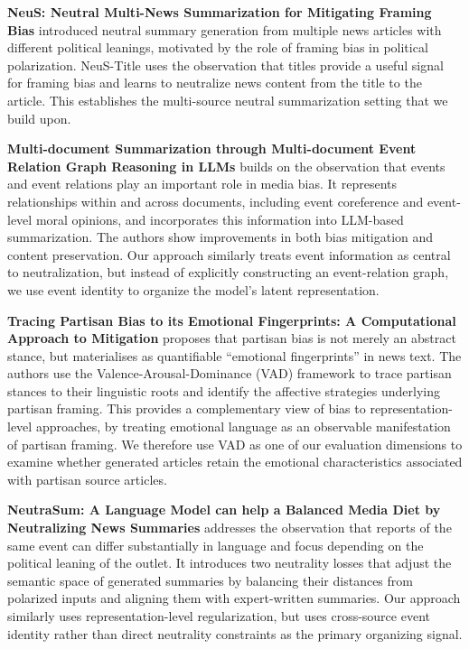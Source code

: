 \documentclass[11pt]{article}
\begin{document}
\textbf{NeuS: Neutral Multi-News Summarization for Mitigating Framing Bias} \citep{lee2022neus} introduced neutral summary generation from multiple news articles with different political leanings, motivated by the role of framing bias in political polarization. NeuS-Title uses the observation that titles provide a useful signal for framing bias and learns to neutralize news content from the title to the article. This establishes the multi-source neutral summarization setting that we build upon.

\textbf{Multi-document Summarization through Multi-document Event Relation Graph Reasoning in LLMs} \citep{lei2025multidoc} builds on the observation that events and event relations play an important role in media bias. It represents relationships within and across documents, including event coreference and event-level moral opinions, and incorporates this information into LLM-based summarization. The authors show improvements in both bias mitigation and content preservation. Our approach similarly treats event information as central to neutralization, but instead of explicitly constructing an event-relation graph, we use event identity to organize the model's latent representation.

\textbf{Tracing Partisan Bias to its Emotional Fingerprints: A Computational Approach to Mitigation} \citep{liu2025emotional} proposes that partisan bias is not merely an abstract stance, but materialises as quantifiable ``emotional fingerprints'' in news text. The authors use the Valence-Arousal-Dominance (VAD) framework to trace partisan stances to their linguistic roots and identify the affective strategies underlying partisan framing. This provides a complementary view of bias to representation-level approaches, by treating emotional language as an observable manifestation of partisan framing. We therefore use VAD as one of our evaluation dimensions to examine whether generated articles retain the emotional characteristics associated with partisan source articles.

\textbf{NeutraSum: A Language Model can help a Balanced Media Diet by Neutralizing News Summaries} \citep{neutrasum2025} addresses the observation that reports of the same event can differ substantially in language and focus depending on the political leaning of the outlet. It introduces two neutrality losses that adjust the semantic space of generated summaries by balancing their distances from polarized inputs and aligning them with expert-written summaries. Our approach similarly uses representation-level regularization, but uses cross-source event identity rather than direct neutrality constraints as the primary organizing signal.
\end{document}
